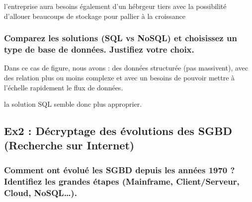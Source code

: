 \documentclass{article}
\begin{document}
l'entreprise aura besoins également d'un hébrgeur tiers avec la possibilité d'allouer beaucoups de stockage pour pallier à la croissance 

\subsubsection{Comparez les solutions (SQL vs NoSQL) et choisissez un type de base de données. Justifiez votre 
choix.}
Dans ce cas de figure, nous avons :
des données structurée (pas massivent), avec des relation plus ou moins complexe et avec un besoins de pouvoir mettre à l'échelle rapidement le flux de données.

la solution SQL semble donc plus approprier. 

\subsection{Ex2 : Décryptage des évolutions des SGBD (Recherche sur Internet)}
\subsubsection{Comment ont évolué les SGBD depuis les années 1970 ? Identifiez les grandes étapes (Mainframe, 
Client/Serveur, Cloud, NoSQL…).}
\end{document}
